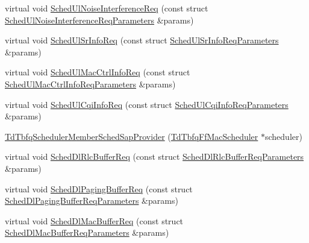 \begin{DoxyCompactItemize}
\item 
virtual void \hyperlink{classns3_1_1TdTbfqSchedulerMemberSchedSapProvider_a8c5eced0f1ca1ceb85279e40e6194f09}{Sched\+Ul\+Noise\+Interference\+Req} (const struct \hyperlink{structns3_1_1FfMacSchedSapProvider_1_1SchedUlNoiseInterferenceReqParameters}{Sched\+Ul\+Noise\+Interference\+Req\+Parameters} \&params)
\item 
virtual void \hyperlink{classns3_1_1TdTbfqSchedulerMemberSchedSapProvider_a55c34f0dd0d14b03a1953763e3405d5e}{Sched\+Ul\+Sr\+Info\+Req} (const struct \hyperlink{structns3_1_1FfMacSchedSapProvider_1_1SchedUlSrInfoReqParameters}{Sched\+Ul\+Sr\+Info\+Req\+Parameters} \&params)
\item 
virtual void \hyperlink{classns3_1_1TdTbfqSchedulerMemberSchedSapProvider_a7e1067aef19bfc64e92b44ef95f040e4}{Sched\+Ul\+Mac\+Ctrl\+Info\+Req} (const struct \hyperlink{structns3_1_1FfMacSchedSapProvider_1_1SchedUlMacCtrlInfoReqParameters}{Sched\+Ul\+Mac\+Ctrl\+Info\+Req\+Parameters} \&params)
\item 
virtual void \hyperlink{classns3_1_1TdTbfqSchedulerMemberSchedSapProvider_aa28431a52ba47c1ebb303c8849cfa428}{Sched\+Ul\+Cqi\+Info\+Req} (const struct \hyperlink{structns3_1_1FfMacSchedSapProvider_1_1SchedUlCqiInfoReqParameters}{Sched\+Ul\+Cqi\+Info\+Req\+Parameters} \&params)
\item 
\hyperlink{classns3_1_1TdTbfqSchedulerMemberSchedSapProvider_a25cd2741aff1cf484e5934f9d275315a}{Td\+Tbfq\+Scheduler\+Member\+Sched\+Sap\+Provider} (\hyperlink{classns3_1_1TdTbfqFfMacScheduler}{Td\+Tbfq\+Ff\+Mac\+Scheduler} $\ast$scheduler)
\item 
virtual void \hyperlink{classns3_1_1TdTbfqSchedulerMemberSchedSapProvider_a968023cc304b988c2d89e899d03b11c0}{Sched\+Dl\+Rlc\+Buffer\+Req} (const struct \hyperlink{structns3_1_1FfMacSchedSapProvider_1_1SchedDlRlcBufferReqParameters}{Sched\+Dl\+Rlc\+Buffer\+Req\+Parameters} \&params)
\item 
virtual void \hyperlink{classns3_1_1TdTbfqSchedulerMemberSchedSapProvider_a9b6a43d7163e0952803bb6ceb7cc575b}{Sched\+Dl\+Paging\+Buffer\+Req} (const struct \hyperlink{structns3_1_1FfMacSchedSapProvider_1_1SchedDlPagingBufferReqParameters}{Sched\+Dl\+Paging\+Buffer\+Req\+Parameters} \&params)
\item 
virtual void \hyperlink{classns3_1_1TdTbfqSchedulerMemberSchedSapProvider_ab669b2f975086388d3c2b08d9b33a1e8}{Sched\+Dl\+Mac\+Buffer\+Req} (const struct \hyperlink{structns3_1_1FfMacSchedSapProvider_1_1SchedDlMacBufferReqParameters}{Sched\+Dl\+Mac\+Buffer\+Req\+Parameters} \&params)

\end{DoxyCompactItemize}
